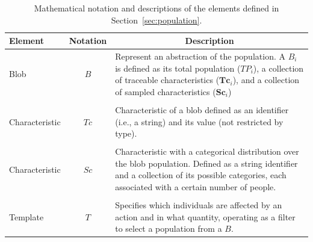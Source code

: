 \documentclass[pdflatex,sn-mathphys-num]{sn-jnl}%
\newcommand\redb[1]{#1}
\theoremstyle{thmstyleone}%
\theoremstyle{thmstyletwo}%
\theoremstyle{thmstylethree}%
\begin{document}
\begin{table}[h]
\redb{
\footnotesize
\centering
\caption{Mathematical notation and descriptions of the elements defined in Section~\ref{sec:population}.}
\label{tbl:notation_pop}
\begin{tabularx}{\linewidth}{@{}lcX@{}}
\toprule
\textbf{Element}                                                             & \textbf{Notation} & \multicolumn{1}{c}{\textbf{Description}}                                                                                                                                                                                                                                                                                     \\ \midrule
Blob                                                               & $B$        & Represent an abstraction of the population. A $B_i$ is defined as its total population ($TP_i$), a collection of traceable characteristics ($\bm{Tc}_i$), and a collection of sampled characteristics ($\bm{Sc}_i$)                                                                                                         \\ \midrule
\begin{tabular}[c]{@{}l@{}}Traceable\\ Characteristic\end{tabular} & $Tc$       & Characteristic of a blob defined as an identifier (i.e., a string) and its value (not restricted by type).                                                                                                                                                                    \\ \midrule
\begin{tabular}[c]{@{}l@{}}Sampled\\ Characteristic\end{tabular}   & $Sc$       & Characteristic with a categorical distribution over the blob population. Defined as a string identifier and a collection of its possible categories, each associated with a certain number of people.                                                                                                                             \\ \midrule
\begin{tabular}[c]{@{}l@{}}Population\\ Template\end{tabular}      & $T$        & Specifies which individuals are affected by an action and in what quantity, operating as a filter to select a population from a $B$.                 \\ \bottomrule
\end{tabularx}
} %
\end{table}
\end{document}

